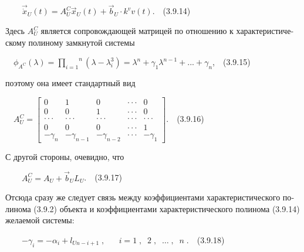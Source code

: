\documentclass[a4paper]{article}
\begin{document}
{\begin{russian}\sffamily
\ \ \ \  $\vec{\dot x}_U(t)=A_U^C\vec x_U(t)+\vec b_U\cdot k^vv(t)$.\ \ (3.9.14)
\end{russian}}

{\begin{russian}\sffamily
Здесь  $A_U^C$ является сопровождающей матрицей по отношению к характеристическому полиному замкнутой системы
\end{russian}}

{\begin{russian}\sffamily
\ \  $ϕ_{A^C}\left(λ\right)=\overset n{\underset{i=1}{\prod }}\left(λ-λ_i^3\right)=λ^n+γ_1λ^{n-1}+...+γ_n$,\ \ (3.9.15)
\end{russian}}

{\begin{russian}\sffamily
поэтому она имеет стандартный вид
\end{russian}}

{\begin{russian}\sffamily
\ \  $A_U^C=\left[\begin{matrix}0&1&0&\cdot \cdot \cdot &0\\0&0&1&\cdot \cdot \cdot &0\\\cdot \cdot \cdot &\cdot \cdot
\cdot &\cdot \cdot \cdot &\cdot \cdot \cdot &\cdot \cdot \cdot \\0&0&0&\cdot \cdot \cdot
&1\\-γ_n&-γ_{n-1}&-γ_{n-2}&\cdot \cdot \cdot &-γ_1\end{matrix}\right]$.\ \ (3.9.16)
\end{russian}}

{\begin{russian}\sffamily
С другой стороны, очевидно, что
\end{russian}}

{\begin{russian}\sffamily
\ \ \ \  $A_U^C=A_U+\vec b_UL_U$.\ \ (3.9.17)
\end{russian}}

{\begin{russian}\sffamily
Отсюда сразу же следует связь между коэффициентами характеристического полинома (3.9.2) объекта и коэффициентами
характеристического полинома (3.9.14) желаемой системы:
\end{russian}}

{\begin{russian}\sffamily
\ \ \ \  $-γ_i=-α_i+l_{Un-i+1}\;,\;\;\;\;\;\;i=1\;,\;\;2\;,\;\;\ldots \;,\;\;n\;.$\ \ (3.9.18)
\end{russian}}
\end{document}
